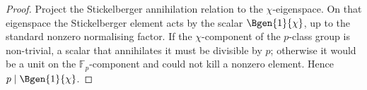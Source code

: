 \begin{proof}\leanok
Project the Stickelberger annihilation relation to the \(\chi\)-eigenspace.
On that eigenspace the Stickelberger element acts by the scalar
\(\Bgen{1}{\chi}\), up to the standard nonzero normalising factor.  If the
\(\chi\)-component of the \(p\)-class group is non-trivial, a scalar that
annihilates it must be divisible by \(p\); otherwise it would be a unit on the
\(\mathbb F_p\)-component and could not kill a nonzero element.  Hence
\(p\mid \Bgen{1}{\chi}\).
\end{proof}
